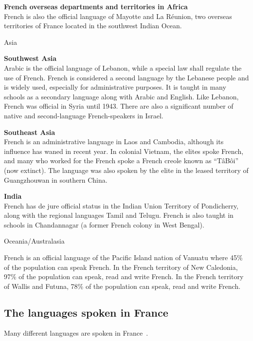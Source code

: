 \begin{multicols}{2}
{\bf French overseas departments and territories in Africa}\\
French is also the official language of Mayotte and La Réunion, two
overseas territories of France located in the southwest Indian Ocean.

\vspace{1cm}
\begin{center}
{\sc Asia}
\end{center}

{\bf Southwest Asia}\\ 
Arabic is the official language of Lebanon, while a special law shall
regulate the use of French. French is considered a second language by
the Lebanese people and is widely used, especially for administrative
purposes. It is taught in many schools as a secondary language along
with Arabic and English. Like Lebanon, French was official in Syria
until 1943. There are also a significant number of native and
second-language French-speakers in Israel.

{\bf Southeast Asia }\\
French is an administrative language in Laos and Cambodia, although
its influence has waned in recent year. In colonial Vietnam, the
elites spoke French, and many who worked for the French spoke a French
creole known as ``TâBôi'' (now extinct). The language was also spoken
by the elite in the leased territory of Guangzhouwan in southern
China.

{\bf India}\\
French has de jure official status in the Indian Union Territory of
Pondicherry, along with the regional languages Tamil and
Telugu. French is also taught in schools in Chandannagar (a former
French colony in West Bengal).

\vspace{0.5cm}
\begin{center}
{\sc Oceania/Australasia}
\end{center}
French is an official language of the Pacific Island nation of Vanuatu
where 45\% of the population can speak French. In the French territory
of New Caledonia, 97\% of the population can speak, read and write
French. In the French territory of Wallis and Futuna, 78\% of the
population can speak, read and write French.

\subsection{The languages spoken in France}
\label{languageSpokenInTheFranceEn}
Many different languages are spoken in France~\cite{francais}.


\end{multicols}
